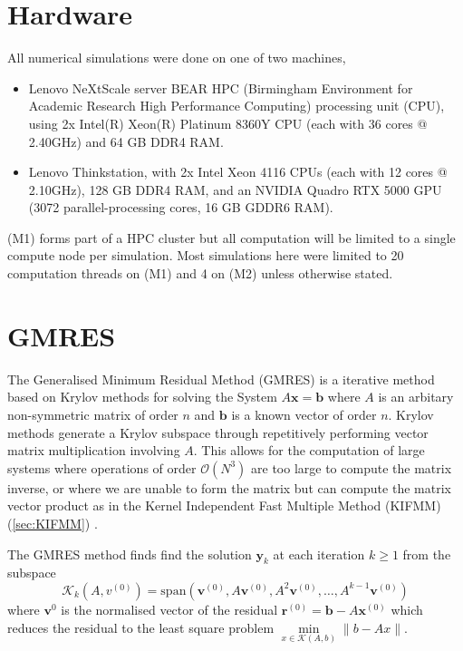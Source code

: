 \appendix
\FloatBarrier
\section{Hardware}\label{appendix:Hardware}
All numerical simulations were done on one of two machines,
\begin{itemize}
    \item [(M1)] Lenovo NeXtScale server BEAR HPC (Birmingham Environment for Academic Research High Performance Computing) processing unit (CPU), using 2x Intel(R) Xeon(R) Platinum 8360Y CPU  (each with 36 cores @ 2.40GHz) and 64 GB DDR4 RAM.
    \item [(M2)] Lenovo Thinkstation, with 2x Intel Xeon 4116 CPUs (each with 12 cores @ 2.10GHz), 128 GB DDR4 RAM, and an NVIDIA Quadro RTX 5000 GPU (3072 parallel-processing cores, 16 GB GDDR6 RAM).
\end{itemize}
(M1) forms part of a HPC cluster but all computation will be limited to a single compute node per simulation. Most simulations here were limited to 20 computation threads on (M1) and 4 on (M2) unless otherwise stated.


\FloatBarrier
\section{GMRES}\label{appendix:GMRES}

The Generalised Minimum Residual Method (GMRES) \cite{Saad1986GMRES:Systems} is a iterative method based on Krylov methods for solving the System $A\bm{x}=\bm{b}$ where $A$ is an arbitary non-symmetric matrix of order $n$ and $\bm{b}$ is a known vector of order $n$. Krylov methods generate a Krylov subspace through repetitively performing vector matrix multiplication involving $A$. This allows for the computation of large systems where operations of order $\mathcal{O}(N^3)$ are too large to compute the matrix inverse, or where we are unable to form the matrix but can compute the matrix vector product as in the Kernel Independent Fast Multiple Method (KIFMM) (\cref{sec:KIFMM}) \cite{Ipsen1998TheMethods}.

The GMRES method finds find the solution $\bm{y}_k$ at each iteration $k \geq 1$ from the subspace
\begin{equation*}
    \mathcal{K}_k(A,v^{(0)}) = \text{span}(\bm{v}^{(0)},A\bm{v}^{(0)},A^2\bm{v}^{(0)},\dots,A^{k-1}\bm{v}^{(0)})
\end{equation*}
where $\bm{v}^{0}$ is the normalised vector of the residual $\bm{r}^{(0)}=\bm{b}-A\bm{x}^{(0)}$ which reduces the residual to the least square problem $\min\limits_{x\in\mathcal{K}(A,b)} \lVert b-Ax \rVert$.

